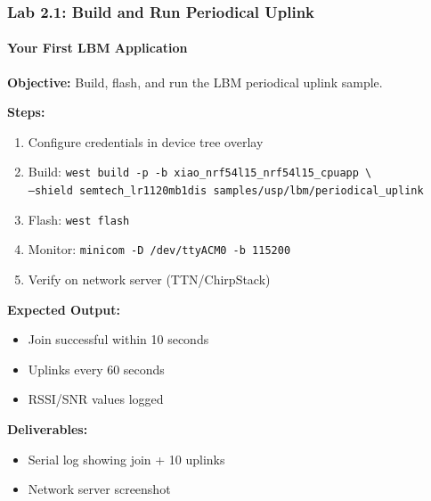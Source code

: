 \documentclass{beamer}
\begin{document}
\begin{frame}
\frametitle{Lab 2.1: Build and Run Periodical Uplink}
\framesubtitle{Your First LBM Application}

\textbf{Objective:} Build, flash, and run the LBM periodical uplink sample.

\textbf{Steps:}
\begin{enumerate}
    \item Configure credentials in device tree overlay
    \item Build: \texttt{west build -p -b xiao\_nrf54l15\_nrf54l15\_cpuapp \textbackslash\\
          --shield semtech\_lr1120mb1dis samples/usp/lbm/periodical\_uplink}
    \item Flash: \texttt{west flash}
    \item Monitor: \texttt{minicom -D /dev/ttyACM0 -b 115200}
    \item Verify on network server (TTN/ChirpStack)
\end{enumerate}

\textbf{Expected Output:}
\begin{itemize}
    \item Join successful within 10 seconds
    \item Uplinks every 60 seconds
    \item RSSI/SNR values logged
\end{itemize}

\textbf{Deliverables:}
\begin{itemize}
    \item Serial log showing join + 10 uplinks
    \item Network server screenshot
\end{itemize}
\end{frame}
\end{document}
